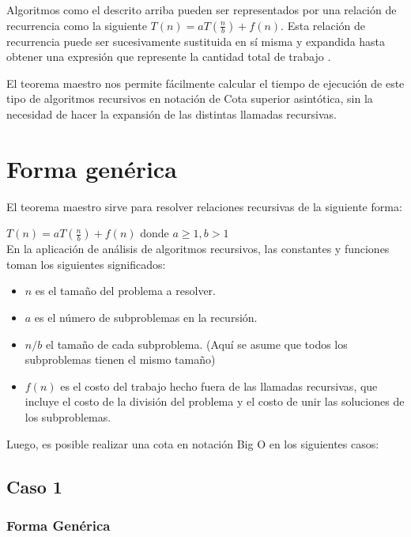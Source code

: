 \documentclass[12pt, letterpaper]{article} %
\begin{document}
Algoritmos como el descrito arriba pueden ser representados por una relación de recurrencia como la siguiente $T(n)=aT(\frac{n}{b})+f(n)$. Esta relación de recurrencia puede ser sucesivamente sustituida en sí misma y expandida hasta obtener una expresión que represente la cantidad total de trabajo \cite{duke}.\\
\vspace{1mm}

El teorema maestro nos permite fácilmente calcular el tiempo de ejecución de este tipo de algoritmos recursivos en notación de Cota superior asintótica, sin la necesidad de hacer la expansión de las distintas llamadas recursivas.\\

\section{Forma genérica}\hline
El teorema maestro sirve para resolver relaciones recursivas de la siguiente forma:

\par \hspace{3mm} $T(n)=aT(\frac{n}{b})+f(n)$ donde $a \geq 1, b>1$\\

En la aplicación de análisis de algoritmos recursivos, las constantes y funciones toman los siguientes significados:

\begin{itemize}
    \item $n$ es el tamaño del problema a resolver.
    \item $a$ es el número de subproblemas en la recursión.
    \item $n/b$ el tamaño de cada subproblema. (Aquí se asume que todos los subproblemas tienen el mismo tamaño)
    \item $f(n)$ es el costo del trabajo hecho fuera de las llamadas recursivas, que incluye el costo de la división del problema y el costo de unir las soluciones de los subproblemas.

\end{itemize}
Luego, es posible realizar una cota en notación Big O en los siguientes casos:\\

\subsection{Caso 1}
\subsubsection{Forma Genérica}
\end{document}
